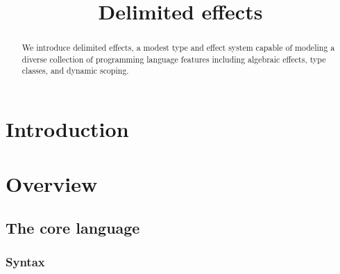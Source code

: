 \documentclass[12pt]{article}
\title{Delimited effects}
\date{}
\begin{document}
  \maketitle

  \begin{abstract}
    We introduce delimited effects, a modest type and effect system capable of modeling a diverse collection of programming language features including algebraic effects, type classes, and dynamic scoping.
  \end{abstract}

  \section{Introduction}

    \iffalse
      \begin{lstlisting}[gobble=4]
        effect IO
          getLine   : String ! IO
          printLine : String -> () ! IO
      \end{lstlisting}

      \begin{lstlisting}[gobble=4]
        effect Monoid a
          mempty  : a ! Monoid a
          mappend : a -> a -> a ! Monoid a
      \end{lstlisting}
    \fi

  \section{Overview}

    \subsection{The core language}

      \subsubsection{Syntax}
\end{document}
